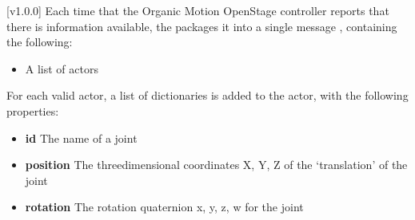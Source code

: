[v1.0.0]
Each time that the Organic Motion OpenStage controller reports that there is information
available, the  packages it into a single message
\openSq{}\closeSq, containing the following:
\begin{itemize}
\item A list of actors
\end{itemize}

For each valid actor, a list of dictionaries is added to the actor, with the following
properties:
\begin{itemize}
\item\textbf{id} The name of a joint
\item\exSp\textbf{position} The three\longDash{}dimensional coordinates \openSq{}X, Y,
Z\closeSq{} of the `translation' of the joint
\item\exSp\textbf{rotation} The rotation quaternion \openSq{}x, y, z, w\closeSq{} for the
joint
\end{itemize}
\primaryEnd{}
